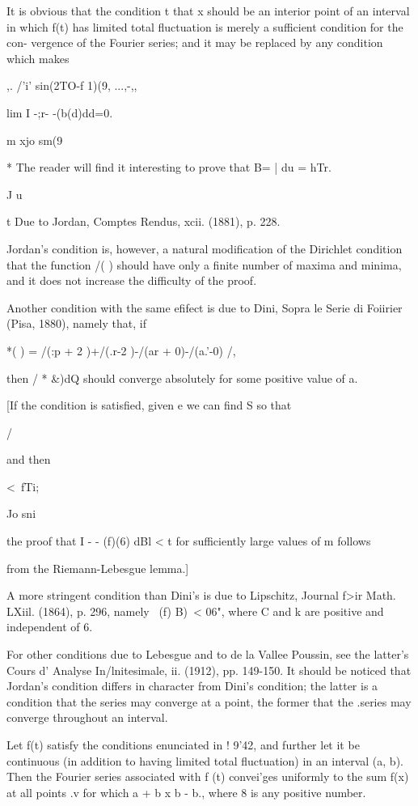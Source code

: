 It is obvious that the condition t that x should be an interior point
of an interval in which f(t) has limited total fluctuation is merely a
sufficient condition for the con- vergence of the Fourier series; and
it may be replaced by any condition which makes

,. /'i' sin(2TO-f 1)(9, ...,-,,

lim I -;r- -(b(d)dd=0.

m xjo sm(9

* The reader will find it interesting to prove that B= | du = hTr.

J u

t Due to Jordan, Comptes Rendus, xcii. (1881), p. 228.

%
%

Jordan's condition is, however, a natural modification of the
Dirichlet condition that the function /( ) should have only a finite
number of maxima and minima, and it does not increase the difficulty
of the proof.

Another condition with the same efifect is due to Dini, Sopra le Serie
di Foiirier (Pisa, 1880), namely that, if

*( ) = /(:p + 2 )+/(.r-2 )-/(ar + 0)-/(a.'-0) /,

then / * \&)dQ should converge absolutely for some positive value of
a.

[If the condition is satisfied, given e we can find S so that

/

and then

<\ fTi;

Jo sni

the proof that I - - (f)(6) dBl < t for sufficiently large values of m
follows

from the Riemann-Lebesgue lemma.]

A more stringent condition than Dini's is due to Lipschitz, Journal
f>ir Math. LXiil. (1864), p. 296, namely \ (f) B)\ < 06", where C and
k are positive and independent of 6.

For other conditions due to Lebesgue and to de la Vallee Poussin, see
the latter's Cours d' Analyse In/lnitesimale, ii. (1912), pp. 149-150.
It should be noticed that Jordan's condition differs in character from
Dini's condition; the latter is a condition that the series may
converge at a point, the former that the .series may converge
throughout an interval.

Let f(t) satisfy the conditions enunciated in ! 9'42, and further let
it be continuous (in addition to having limited total fluctuation) in
an interval (a, b). Then the Fourier series associated with f (t)
convei'ges uniformly to the sum f(x) at all points .v for which a + b
x b - b., where 8 is any positive number.

